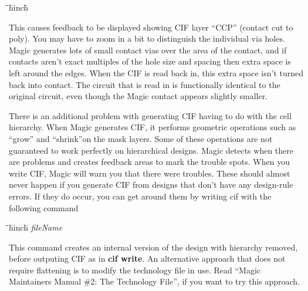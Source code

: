 \documentclass[letterpaper,twoside,12pt]{article}
\def\hinch{\hspace*{0.5in}}
\def\starti{\begin{center}\begin{tabbing}\hinch\=\hinch\=\hinch\=hinch\hinch\=\kill}
\def\endi{\end{tabbing}\end{center}}
\def\ii{\>\>\>}
\begin{document}
\starti
   \ii {\bfseries :cif see CCP}
\endi

This causes feedback to be displayed showing CIF layer ``CCP''
(contact cut to poly).  You may have to zoom in a bit to
distinguish the individual via holes.  Magic generates lots of
small contact vias over
the area of the contact, and if contacts aren't exact multiples
of the hole size and spacing then extra space is left around
the edges.  When the CIF is read back in, this extra space isn't
turned back into contact.  The circuit that is read in is
functionally identical to the original circuit, even though
the Magic contact appears slightly smaller.

There is an additional problem with generating CIF having to
do with the cell hierarchy.  When Magic generates CIF, it performs
geometric operations such as ``grow'' and ``shrink''on the mask
layers.  Some of these operations are not guaranteed to work
perfectly on hierarchical designs.  Magic detects when there are
problems and creates feedback areas to mark the trouble spots.
When you write CIF, Magic will warn you that there were troubles.
These should almost never happen if you generate CIF from designs
that don't have any design-rule errors.  If they do occur, you
can get around them by writing cif with the following command

\starti
   \ii {\bfseries :cif flat} {\itshape fileName}
\endi

This command creates an internal version of the design with hierarchy
removed, before outputing CIF as in {\bfseries cif write}.  An alternative
approach that does not require flattening is to modify the technology
file in use.  Read ``Magic Maintainers Manual \#2:  The Technology File'',
if you want to try this approach.
\end{document}
